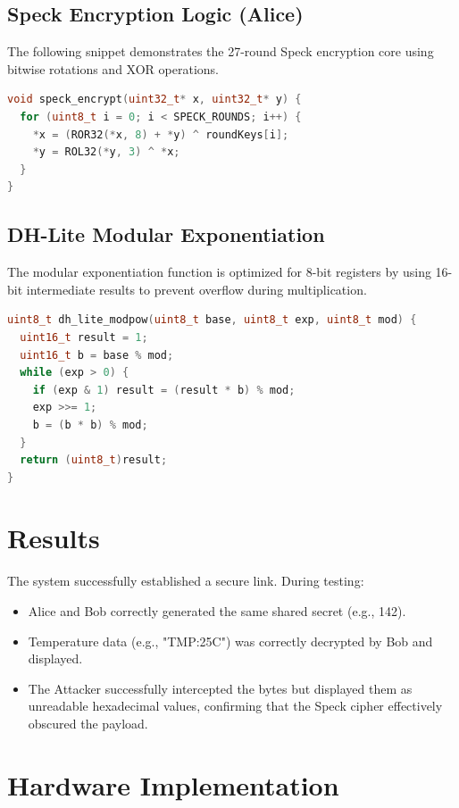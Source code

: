 \documentclass[12pt,a4paper]{article}
\begin{document}
\subsection{Speck Encryption Logic (Alice)}
The following snippet demonstrates the 27-round Speck encryption core using bitwise rotations and XOR operations.
\begin{lstlisting}[language=C++]
void speck_encrypt(uint32_t* x, uint32_t* y) {
  for (uint8_t i = 0; i < SPECK_ROUNDS; i++) {
    *x = (ROR32(*x, 8) + *y) ^ roundKeys[i];
    *y = ROL32(*y, 3) ^ *x;
  }
}
\end{lstlisting}

\subsection{DH-Lite Modular Exponentiation}
The modular exponentiation function is optimized for 8-bit registers by using 16-bit intermediate results to prevent overflow during multiplication.
\begin{lstlisting}[language=C++]
uint8_t dh_lite_modpow(uint8_t base, uint8_t exp, uint8_t mod) {
  uint16_t result = 1;
  uint16_t b = base % mod;
  while (exp > 0) {
    if (exp & 1) result = (result * b) % mod;
    exp >>= 1;
    b = (b * b) % mod;
  }
  return (uint8_t)result;
}
\end{lstlisting}

\section{Results}
The system successfully established a secure link. During testing:
\begin{itemize}
    \item Alice and Bob correctly generated the same shared secret (e.g., 142).
    \item Temperature data (e.g., "TMP:25C") was correctly decrypted by Bob and displayed.
    \item The Attacker successfully intercepted the bytes but displayed them as unreadable hexadecimal values, confirming that the Speck cipher effectively obscured the payload.
\end{itemize}

\section{Hardware Implementation}
\end{document}
